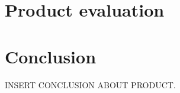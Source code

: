 
\section{Product evaluation}



\section{Conclusion}


INSERT CONCLUSION ABOUT PRODUCT.

\clearpage